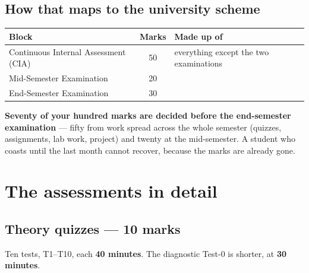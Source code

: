 \documentclass[11pt]{article}
\begin{document}
\subsection{How that maps to the university scheme}

\begin{center}
\begin{tabular}{@{}lcl@{}}
\toprule
\textbf{Block} & \textbf{Marks} & \textbf{Made up of}\\
\midrule
Continuous Internal Assessment (CIA) & 50 & everything except the two examinations\\
Mid-Semester Examination & 20 & \\
End-Semester Examination & 30 & \\
\bottomrule
\end{tabular}
\end{center}

\begin{keyidea}
\textbf{Seventy of your hundred marks are decided before the end-semester
examination} --- fifty from work spread across the whole semester (quizzes,
assignments, lab work, project) and twenty at the mid-semester. A student who
coasts until the last month cannot recover, because the marks are already gone.
\end{keyidea}

\newpage
\section{The assessments in detail}

\subsection{Theory quizzes --- 10 marks}

Ten tests, T1--T10, each \textbf{40 minutes}. The diagnostic Test-0 is shorter,
at \textbf{30 minutes}.
\end{document}
